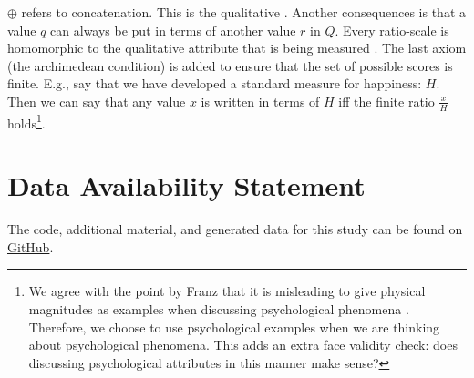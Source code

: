 \documentclass[utf8]{FrontiersinVancouver}
\begin{document}
$\oplus$ refers to concatenation. This is the qualitative . Another consequences is that a value $q$ can always be put in terms of another value $r$ in $Q$. Every ratio-scale is homomorphic to the qualitative attribute that is being measured \citep{michellAxiomsQuantityTheory1997}. The last axiom (the archimedean condition) is added to ensure that the set of possible scores is finite. E.g., say that we have developed a standard measure for happiness: $H$. Then we can say that any value $x$ is written in terms of $H$ iff the finite ratio $\frac{x}{H}$ holds\footnote{We agree with the point by Franz that it is misleading to give physical magnitudes as examples when discussing psychological phenomena \citep{franzArePsychologicalAttributes2022}. Therefore, we choose to use psychological examples when we are thinking about psychological phenomena. This adds an extra face validity check: does discussing psychological attributes in this manner make sense?}.


\section*{Data Availability Statement}
The code, additional material, and generated data for this study can be found on \href{https://github.com/MvanSteenbergen/MasterThesisRQA}{GitHub}.





\end{document}
